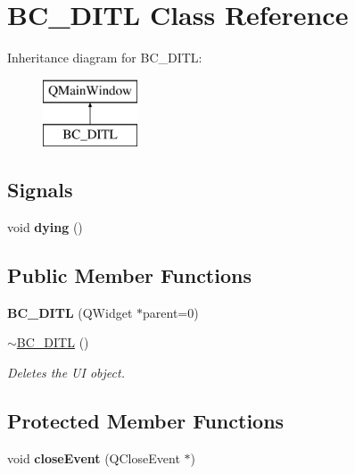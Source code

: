 \hypertarget{class_b_c___d_i_t_l}{}\section{B\+C\+\_\+\+D\+I\+TL Class Reference}
\label{class_b_c___d_i_t_l}
Inheritance diagram for B\+C\+\_\+\+D\+I\+TL\+:\begin{figure}[H]
\begin{center}
\leavevmode
\includegraphics[height=2.000000cm]{class_b_c___d_i_t_l}
\end{center}
\end{figure}
\subsection*{Signals}
\begin{DoxyCompactItemize}
\item 
void {\bfseries dying} ()\hypertarget{class_b_c___d_i_t_l_a606f51e2d6c026e1198c3a2d0a5c17f0}{}\label{class_b_c___d_i_t_l_a606f51e2d6c026e1198c3a2d0a5c17f0}

\end{DoxyCompactItemize}
\subsection*{Public Member Functions}
\begin{DoxyCompactItemize}
\item 
{\bfseries B\+C\+\_\+\+D\+I\+TL} (Q\+Widget $\ast$parent=0)\hypertarget{class_b_c___d_i_t_l_a47efff48da269b402d29e458726023d9}{}\label{class_b_c___d_i_t_l_a47efff48da269b402d29e458726023d9}

\item 
\hyperlink{class_b_c___d_i_t_l_a9a570b8e6b5304a0f96748bc0eb69cd1}{$\sim$\+B\+C\+\_\+\+D\+I\+TL} ()\hypertarget{class_b_c___d_i_t_l_a9a570b8e6b5304a0f96748bc0eb69cd1}{}\label{class_b_c___d_i_t_l_a9a570b8e6b5304a0f96748bc0eb69cd1}

\begin{DoxyCompactList}\small\item\em Deletes the UI object. \end{DoxyCompactList}\end{DoxyCompactItemize}
\subsection*{Protected Member Functions}
\begin{DoxyCompactItemize}
\item 
void {\bfseries close\+Event} (Q\+Close\+Event $\ast$)\hypertarget{class_b_c___d_i_t_l_a102cbea9e530ddaf14989ab558799c6d}{}\label{class_b_c___d_i_t_l_a102cbea9e530ddaf14989ab558799c6d}

\end{DoxyCompactItemize}


